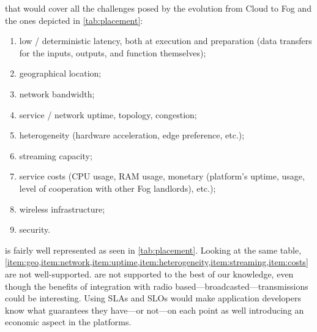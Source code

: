 \begin{description}[leftmargin=10pt]
	\item[Lack of \acrfullpl{SLA}] that would cover all the challenges posed by the evolution from Cloud to Fog \cite{chiang_fog_2016, bonomi_fog_2012} and the ones depicted in \cref{tab:placement}:
		\begin{enumerate}[(1)]
			\item \label{item:latency} low / deterministic latency, both at execution and preparation (data transfers for the inputs, outputs, and function themselves);
			\item \label{item:geo} geographical location;
			\item \label{item:network} network bandwidth;
			\item \label{item:uptime} service / network uptime, topology, congestion;
			\item \label{item:heterogeneity} heterogeneity (hardware acceleration, edge preference, etc.);
			\item \label{item:streaming} streaming capacity;
			\item \label{item:costs} service costs (CPU usage, RAM usage, monetary (platform's uptime, usage, level of cooperation with other Fog landlords), etc.);
			\item \label{item:wireless} wireless infrastructure;
			\item \label{item:security} security.
		\end{enumerate}
		 is fairly well represented as seen in \cref{tab:placement}. Looking at the same table, \cref{item:geo,item:network,item:uptime,item:heterogeneity,item:streaming,item:costs} are not well-supported.  are not supported to the best of our knowledge, even though the benefits of integration with radio based—broadcasted—transmissions could be interesting. Using \glspl{SLA} and \glspl{SLO} would make application developers know what guarantees they have—or not—on each point as well introducing an economic aspect in the platforms.


\end{description}
